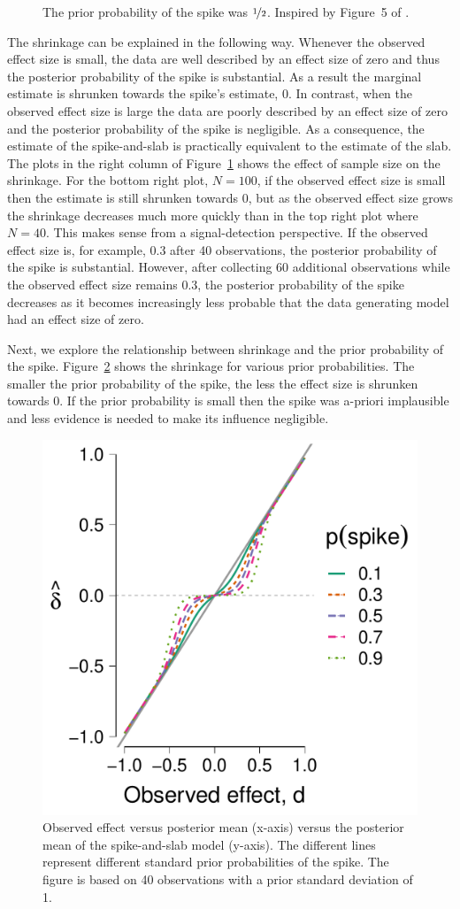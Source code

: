 \documentclass[a4paper]{article}
\newenvironment{revision}{\color{teal}}{\color{black}}
\begin{document}
\begin{revision}
\begin{figure}[!ht]
{		The prior probability of the spike was $\nicefrac{1}{2}$.
		Inspired by Figure~5 of \textcite{RouderEtAl2018PBR}.
	}
	\label{fig:S_vs_SS_4_panel}
\end{figure}
The shrinkage can be explained in the following way.
Whenever the observed effect size is small, the data are well described by an effect size of zero and thus the posterior probability of the spike is substantial.
As a result the marginal estimate is shrunken towards the spike's estimate, 0.
In contrast, when the observed effect size is large the data are poorly described by an effect size of zero and the posterior probability of the spike is negligible.
As a consequence, the estimate of the spike-and-slab is practically equivalent to the estimate of the slab.
The plots in the right column of Figure~\ref{fig:S_vs_SS_4_panel} shows the effect of sample size on the shrinkage.
For the bottom right plot, $N = 100$, if the observed effect size is small then the estimate is still shrunken towards 0, but as the observed effect size grows the shrinkage decreases much more quickly than in the top right plot where $N = 40$.
This makes sense from a signal-detection perspective. 
If the observed effect size is, for example, 0.3 after 40 observations, the posterior probability of the spike is substantial.
However, after collecting 60 additional observations while the observed effect size remains 0.3, the posterior probability of the spike decreases as it becomes increasingly less probable that the data generating model had an effect size of zero.


Next, we explore the relationship between shrinkage and the prior probability of the spike.
Figure~\ref{fig:S_vs_SS_PH0_40} shows the shrinkage for various prior probabilities.
The smaller the prior probability of the spike, the less the effect size is shrunken towards 0.
If the prior probability is small then the spike was a-priori implausible and less evidence is needed to make its influence negligible.
\begin{figure}[!ht]
	\centering
	\includegraphics[width=.5\textwidth]{posteriorMeanVsSampleDelta_ph0_n_40_big_font.pdf}
	\caption{%
		Observed effect versus posterior mean (x-axis) versus the posterior mean of the spike-and-slab model (y-axis). The different lines represent different standard prior probabilities of the spike. The figure is based on 40 observations with a prior standard deviation of 1.
	}
	\label{fig:S_vs_SS_PH0_40}
\end{figure}


\end{revision}
\end{document}
